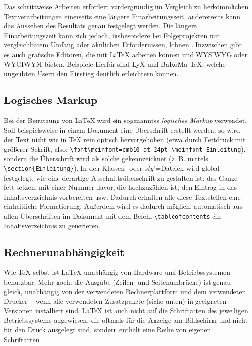 Das schrittweise Arbeiten erfordert vordergründig im Vergleich zu herkömmlichen
Textverarbeitungen einerseits eine längere Einarbeitungszeit, andererseits kann
das Aussehen des Resultats genau festgelegt werden. Die längere
Einarbeitungszeit kann sich jedoch, insbesondere bei Folgeprojekten mit
vergleichbarem Umfang oder ähnlichen Erfordernissen, lohnen \cite{Fenn09}.
Inzwischen gibt es auch grafische Editoren, die mit \LaTeX{} arbeiten können
und WYSIWYG oder WYGIWYM bieten. Beispiele hierfür sind LyX und BaKoMa \TeX{},
welche ungeübten Usern den Einstieg deutlich erleichtern können.


\subsection{Logisches Markup}

Bei der Benutzung von \LaTeX{} wird ein sogenanntes \emph{logisches Markup}
verwendet.  Soll beispielsweise in einem Dokument eine Überschrift erstellt
werden, so wird der Text nicht wie in \TeX{} rein optisch hervorgehoben (etwa
durch Fettdruck mit größerer Schrift, also: 
\verb.\font\meinfont=cmb10 at 24pt \meinfont Einleitung.), sondern die
Überschrift wird als solche gekennzeichnet (z. B. mittels
\verb=\section{Einleitung}=). In den Klassen- oder \emph{sty}"=Dateien wird
global festgelegt, wie eine derartige Abschnittsüberschrift zu gestalten ist:
\glqq{}das Ganze fett setzen; mit einer Nummer davor, die hochzuzählen ist; den
Eintrag in das Inhaltsverzeichnis vorbereiten\grqq{} usw. Dadurch erhalten alle
diese Textstellen eine einheitliche Formatierung. Außerdem wird es dadurch
möglich, automatisch aus allen Überschriften im Dokument mit dem Befehl
\verb=\tableofcontents= ein Inhaltsverzeichnis zu generieren.

\subsection{Rechnerunabhängigkeit}

Wie \TeX{} selbst ist \LaTeX{} unabhängig von Hardware und Betriebssystemen
benutzbar. Mehr noch, die Ausgabe (Zeilen- und Seitenumbrüche) ist genau
gleich, unabhängig von der verwendeten Rechnerplattform und dem verwendeten
Drucker – wenn alle verwendeten Zusatzpakete (siehe unten) in geeigneten
Versionen installiert sind. \LaTeX{} ist auch nicht auf die Schriftarten des
jeweiligen Betriebssystems angewiesen, die oftmals für die Anzeige am
Bildschirm und nicht für den Druck ausgelegt sind, sondern enthält eine Reihe
von eigenen Schriftarten.

